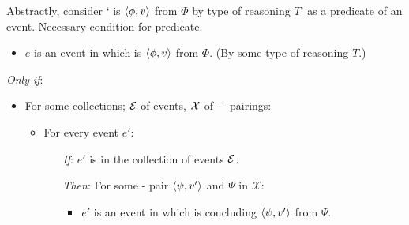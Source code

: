 \begin{note}
  Abstractly, consider `\vAgent{} is \emph{\tCV{}} \(\langle \phi, v \rangle\) from \(\Phi\) by type of reasoning \(T\)' as a predicate of an event.
  Necessary condition for predicate.

  \begin{idea}[\tCN{2}]
    \label{idea:tR-law}

    \begin{itemize}
    \item
      \(e\) is an event in which \vAgent{} is \emph{\tCV{}} \(\langle \phi, v \rangle\) from \(\Phi\).\newline
      \hfill(By some type of reasoning \(T\).)
    \end{itemize}

    \emph{Only if}:

    \begin{itemize}
    \item
      For some collections; \({\cal E}\) of events, \({\cal X}\) of --~pairings:
      \begin{itemize}
      \item
        For every event \(e'\):
        \begin{enumerate}
        \item[\emph{If}:]
          \(e'\) is in the collection of events \({\cal E}\).
        \item[\emph{Then}:]
          For some -\val{} pair \(\langle \psi, v' \rangle\) and  \(\Psi\) in \(\mathcal{X}\):
          \begin{itemize}
          \item
            \(e'\) is an event in which \vAgent{} is concluding \(\langle \psi, v' \rangle\) from \(\Psi\).
          \end{itemize}
        \end{enumerate}
      \end{itemize}
    \end{itemize}
    \vspace{-\baselineskip}
  \end{idea}


\end{note}
